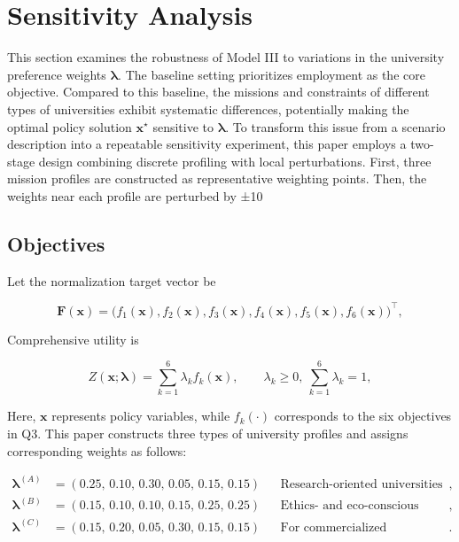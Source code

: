 \documentclass{mcmthesis}
\begin{document}
\section{Sensitivity Analysis}
This section examines the robustness of Model III to variations in the university preference weights $\boldsymbol{\lambda}$. The baseline setting prioritizes employment as the core objective. Compared to this baseline, the missions and constraints of different types of universities exhibit systematic differences, potentially making the optimal policy solution $\mathbf{x}^\star$ sensitive to $\boldsymbol{\lambda}$. To transform this issue from a scenario description into a repeatable sensitivity experiment, this paper employs a two-stage design combining discrete profiling with local perturbations. First, three mission profiles are constructed as representative weighting points. Then, the weights near each profile are perturbed by ±10%

\subsection{Objectives}

Let the normalization target vector be

\[\mathbf{F}(\mathbf{x})=\big(f_1(\mathbf{x}),f_2(\mathbf{x}),f_3(\mathbf{x}),f_4(\mathbf{x}),f_5(\mathbf{x}),f_6(\mathbf{x})\big)^\top,\]

Comprehensive utility is

\begin{equation}Z(\mathbf{x};\boldsymbol{\lambda})=\sum_{k=1}^{6}\lambda_k f_k(\mathbf{x}),\qquad\lambda_k\ge 0,\ \sum_{k=1}^{6}\lambda_k=1,\label{eq:lambda_utility}\end{equation}

Here, $\mathbf{x}$ represents policy variables, while $f_k(\cdot)$ corresponds to the six objectives in Q3. This paper constructs three types of university profiles and assigns corresponding weights as follows:

\[
\begin{aligned}
\boldsymbol{\lambda}^{(A)}&=(0.25,\,0.10,\,0.30,\,0.05,\,0.15,\,0.15)
&&\text{Research-oriented universities focus on cutting-edge innovation and resource conservation},\\
\boldsymbol{\lambda}^{(B)}&=(0.15,\,0.10,\,0.10,\,0.15,\,0.25,\,0.25)
&&\text{Ethics- and eco-conscious universities emphasize restricting AI usage, strengthening governance, and promoting sustainable development},\\
\boldsymbol{\lambda}^{(C)}&=(0.15,\,0.20,\,0.05,\,0.30,\,0.15,\,0.15)
&&\text{For commercialized universities, the focus is on market sensitivity and revenue generation while ensuring compliance requirements are met}.
\end{aligned}
\]
\end{document}
